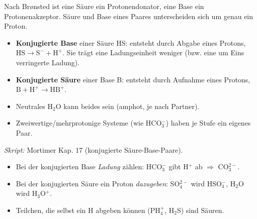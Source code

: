 

Nach Brønsted ist eine Säure ein Protonendonator, eine Base ein
Protonenakzeptor. Säure und Base eines Paares unterscheiden sich um genau
ein Proton.

\begin{werkzeugkasten}
\begin{itemize}
  \item \textbf{Konjugierte Base} einer Säure HS: entsteht durch Abgabe eines
        Protons, $\mathrm{HS \rightarrow S^- + H^+}$. Sie trägt eine
        Ladungseinheit weniger (bzw. eine um Eins verringerte Ladung).
  \item \textbf{Konjugierte Säure} einer Base B: entsteht durch Aufnahme
        eines Protons, $\mathrm{B + H^+ \rightarrow HB^+}$.
  \item Neutrales H$_2$O kann beides sein (amphot, je nach Partner).
  \item Zweiwertige/mehrprotonige Systeme (wie HCO$_3^-$) haben je Stufe ein
        eigenes Paar.
\end{itemize}
\textit{Skript:} Mortimer Kap. 17 (konjugierte Säure-Base-Paare).
\end{werkzeugkasten}

\begin{achtung}
\begin{itemize}
  \item Bei der konjugierten Base \emph{Ladung} zählen: HCO$_3^-$ gibt H$^+$
        ab $\Rightarrow$ CO$_3^{2-}$.
  \item Bei der konjugierten Säure ein Proton \emph{dazugeben}: SO$_4^{2-}$
        wird HSO$_4^-$, H$_2$O wird H$_3$O$^+$.
  \item Teilchen, die selbst ein H abgeben können (PH$_4^+$, H$_2$S) sind
        Säuren.
\end{itemize}
\end{achtung}
